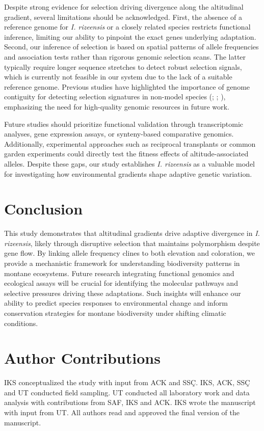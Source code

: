 \documentclass[9pt,a4paper,twoside]{rho-class/rho}
\begin{document}
Despite strong evidence for selection driving divergence along the altitudinal gradient, several limitations should be acknowledged. First, the absence of a reference genome for \textit{I. rizeensis} or a closely related species restricts functional inference, limiting our ability to pinpoint the exact genes underlying adaptation. Second, our inference of selection is based on spatial patterns of allele frequencies and association tests rather than rigorous genomic selection scans. The latter typically require longer sequence stretches to detect robust selection signals, which is currently not feasible in our system due to the lack of a suitable reference genome. Previous studies have highlighted the importance of genome contiguity for detecting selection signatures in non-model species (\cite{hoban2016finding}; \cite{fumagalli2013assessing}; \cite{lotterhos2019effect}), emphasizing the need for high-quality genomic resources in future work.

Future studies should prioritize functional validation through transcriptomic analyses, gene expression assays, or synteny-based comparative genomics. Additionally, experimental approaches such as reciprocal transplants or common garden experiments could directly test the fitness effects of altitude-associated alleles. Despite these gaps, our study establishes \textit{I. rizeensis} as a valuable model for investigating how environmental gradients shape adaptive genetic variation.

\section{Conclusion}

This study demonstrates that altitudinal gradients drive adaptive divergence in \textit{I. rizeensis}, likely through disruptive selection that maintains polymorphism despite gene flow. By linking allele frequency clines to both elevation and coloration, we provide a mechanistic framework for understanding biodiversity patterns in montane ecosystems. Future research integrating functional genomics and ecological assays will be crucial for identifying the molecular pathways and selective pressures driving these adaptations. Such insights will enhance our ability to predict species responses to environmental change and inform conservation strategies for montane biodiversity under shifting climatic conditions.


\section{Author Contributions}
IKS conceptualized the study with input from ACK and SSÇ. IKS, ACK, SSÇ and UT conducted field sampling. UT conducted all laboratory work and data analysis with contributions from SAF, IKS and ACK. IKS wrote the manuscript with input from UT. All authors read and approved the final version of the manuscript.
\end{document}

